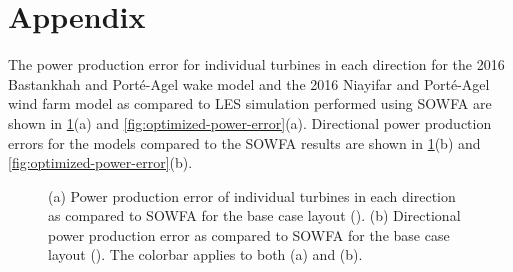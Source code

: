 \documentclass[conf]{new-aiaa}
\begin{document}
\section*{Appendix}
The power production error for individual turbines in each direction for the 2016 Bastankhah and Port\'{e}-Agel wake model and the 2016 Niayifar and Port\'{e}-Agel wind farm model as compared to LES simulation performed using SOWFA are shown in \cref{fig:basecase-power-error}(a) and \cref{fig:optimized-power-error}(a). Directional power production errors for the models compared to the SOWFA results are shown in \cref{fig:basecase-power-error}(b) and \cref{fig:optimized-power-error}(b).
%
\begin{figure}[ht]
	\centering
	\caption{(a) Power production error of individual turbines in each direction as compared to SOWFA for the base case layout (). (b) Directional power production error as compared to SOWFA for the base case layout ().  The colorbar applies to both (a) and (b).}
	\label{fig:basecase-power-error}
\end{figure}
\end{document}
